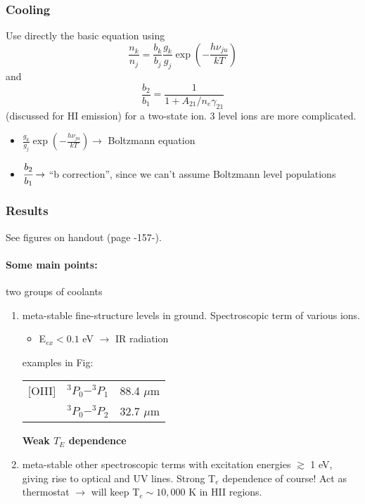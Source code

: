 \documentclass[12pt]{article}
\newcommand{\mar}[1]{\hspace{0pt}\marginpar{-\textcolor{black}{#1}-}}
\begin{document}
\subsubsection{Cooling}

Use directly the basic equation using
\[
    \frac{n_{k}}{n_{j}} = \frac{b_{k}}{b_{j}}
    \frac{g_{k}}{g_{j}}\exp\left(-\frac{h\nu_{ju}}{kT}\right)
    \]
and
\[
    \frac{b_{2}}{b_{1}} = \frac{1}{1 + A_{21}/n_{e}\gamma_{21}}
    \]
(discussed for HI emission) for a two-state ion.
3 level ions are more complicated.
\begin{itemize}
    \item $\frac{g_{k}}{g_{j}}\exp\left(-\frac{h\nu_{ju}}{kT}\right)
        \rightarrow$ Boltzmann equation
    \item $\cfrac{b_{2}}{b_{1}} \rightarrow$ ``b correction'', since we
        can't assume Boltzmann level populations
\end{itemize}

\subsubsection{Results}\mar{156}
See figures on handout (page -157-).

\paragraph{Some main points:} two groups of coolants
\begin{enumerate}
    \item meta-stable fine-structure levels in ground.
        Spectroscopic term of various ions.
        \begin{itemize}
            \item E$_{ex} < 0.1$ eV $\rightarrow$ IR radiation
        \end{itemize}
        examples in Fig:
        \begin{center}
            \begin{tabular}{c c c}
                [OIII] & $^{3}P_{0} - ^{3}P_{1}$ & 88.4 $\mu$m\\
                       & $^{3}P_{0} - ^{3}P_{2}$ & 32.7 $\mu$m\\
            \end{tabular}
        \end{center}
        \textbf{Weak $T_{E}$ dependence}
    \item meta-stable other spectroscopic terms with excitation energies
        $\gtrsim$ 1 eV, giving rise to optical and UV lines.
        Strong T$_{e}$ dependence of course! Act as thermostat
        $\rightarrow$ will keep T$_{e} \sim 10,000$ K in HII regions.
\end{enumerate}
\end{document}
